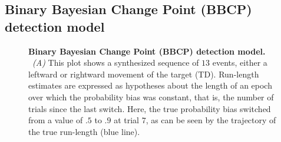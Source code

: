 \documentclass[10pt,letterpaper]{article}
\newcommand{\seeFig}[1]{Figure~\ref{fig:#1}}
\begin{document}
\subsection{Binary Bayesian Change Point (BBCP) detection model}
\label{sec:Binary_Bayesian_change_point}
\begin{figure}%
\caption{\textbf{Binary Bayesian Change Point (BBCP) detection model.}
~\textit{(A)}
This plot shows a synthesized sequence of $13$ events,
either a leftward or rightward movement of the target (TD).
Run-length estimates are expressed as hypotheses about the length of an epoch
over which the probability bias was constant,
that is, the number of trials since the last switch.
Here, the true probability bias switched from a value of $.5$ to $.9$ at trial $7$,
as can be seen by the trajectory of the true run-length (blue line).
}
\end{figure}
\end{document}
